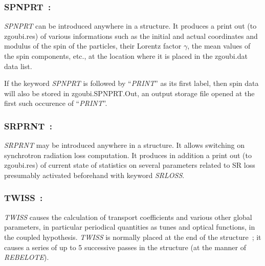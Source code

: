\newpage

\subsubsection*{SPNPRT~: \SPNPRTTitl}\label{SPNPRT}
\medskip 

\noindent  \textsl{SPNPRT} can be introduced anywhere in a structure. It produces
a print out (to zgoubi.res) of various informations such as 
the initial and actual coordinates and modulus of the spin of the \IMAX{}
particles, their Lorentz factor $\gamma$, 
the mean values of the spin components, etc.,  at the location where it is placed in the zgoubi.dat data list.

\medskip


\noindent  If the keyword \textsl{SPNPRT} is followed by ``\textsl{PRINT}'' as its first label, then spin data will also be stored in 
zgoubi.SPNPRT.Out, an output storage file opened at the first such occurence of ``\textsl{PRINT}''. 



\newpage

\subsubsection*{SRPRNT~: \SRPRNTTitl}\label{SRPRNT}
\medskip 

\noindent\textsl{SRPRNT} may be introduced anywhere in a structure. It allows switching on 
synchrotron radiation loss computation. It produces in addition 
a print out (to zgoubi.res) of current state of statistics on several parameters related to 
SR loss  presumably  activated beforehand with keyword \textsl{SRLOSS}. 



 \newpage


\subsubsection*{TWISS~: \TWISSTitl}\label{TWISS} 
\medskip

\textsl{TWISS}   causes the calculation of 
  transport coefficients and various other global parameters, in particular 
periodical quantities as tunes and optical functions, in the coupled hypothesis.  
 \textsl{TWISS} is normally placed at the end of the structure~; it  causes a series 
of up to 5 successive passes in the structure (at the manner of \textsl{REBELOTE}). 

